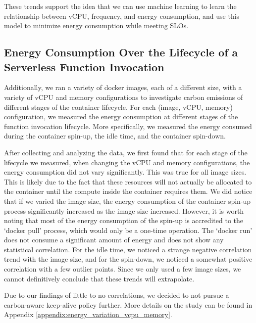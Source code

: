 \documentclass[times, 10pt,twocolumn]{article}
\begin{document}
These trends support the idea that we can use machine learning to learn the relationship between vCPU, frequency, and energy consumption, and use this model to minimize energy consumption while meeting SLOs.

\subsection{Energy Consumption Over the Lifecycle of a Serverless Function Invocation}
Additionally, we ran a variety of docker images, each of a different size, with a variety of vCPU and memory configurations to investigate carbon emissions of different stages of the container lifecycle. For each (image, vCPU, memory) configuration, we measured the energy consumption at different stages of the function invocation lifecycle. More specifically, we measured the energy consumed during the container spin-up, the idle time, and the container spin-down.

After collecting and analyzing the data, we first found that for each stage of the lifecycle we measured, when changing the vCPU and memory configurations, the energy consumption did not vary significantly. This was true for all image sizes. This is likely due to the fact that these resources will not actually be allocated to the container until the compute inside the container requires them. We did notice that if we varied the image size, the energy consumption of the container spin-up process significantly increased as the image size increased. However, it is worth noting that most of the energy consumption of the spin-up is accredited to the `docker pull' process, which would only be a one-time operation. The `docker run' does not consume a significant amount of energy and does not show any statistical correlation. For the idle time, we noticed a strange negative correlation trend with the image size, and for the spin-down, we noticed a somewhat positive correlation with a few outlier points. Since we only used a few image sizes, we cannot definitively conclude that these trends will extrapolate.

Due to our findings of little to no correlations, we decided to not pursue a carbon-aware keep-alive policy further. More details on the study can be found in Appendix \ref{appendix:energy_variation_vcpu_memory}.

\end{document}
